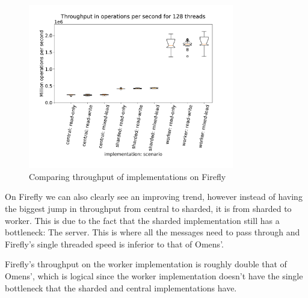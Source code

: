 \documentclass{article}
\begin{document}
\begin{figure}[H]
	\centering
	\includegraphics[width=0.8\textwidth]{boxplots/firefly/boxplot-throughput-in-operations-per-second-for-128-threads.pdf}
	\caption{Comparing throughput of implementations on Firefly}
	\label{fig:throughput-compare-impl-firefly}
\end{figure}
On Firefly we can also clearly see an improving trend, however instead of having
the biggest jump in throughput from central to sharded, it is from sharded to
worker. This is due to the fact that the sharded implementation still has a
bottleneck: The server. This is where all the messages need to pass through and
Firefly's single threaded speed is inferior to that of Omens'. \par
Firefly's throughput on the worker implementation is roughly double that of
Omens', which is logical since the worker implementation doesn't have the single
bottleneck that the sharded and central implementations have.
\end{document}

